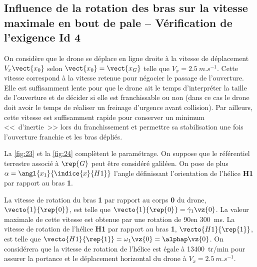 \subsection{Influence de la rotation des bras sur la vitesse maximale en bout de pale ­-- Vérification de l’exigence Id 4}

On considère que le drone se déplace en ligne droite à la vitesse de déplacement $V_x\vect{x_0}$
selon $\vect{x_0} = \vect{x_G}$ telle que $V_x = \SI{2,5}{m.s^{-1}}$. Cette vitesse correspond à la vitesse retenue pour négocier
le passage de l’ouverture. Elle est suffisamment lente pour que le drone ait le temps d’interpréter la taille de l’ouverture et de décider si elle est franchissable ou non (dans ce cas
le drone doit avoir le temps de réaliser un freinage d’urgence avant collision). Par ailleurs,
cette vitesse est suffisamment rapide pour conserver un minimum <<~d’inertie~>> lors du franchissement et permettre sa stabilisation une fois l’ouverture franchie et les bras dépliés.

La \autoref{fig:23} et la \autoref{fig:24} complètent le paramétrage. 
On suppose que le référentiel terrestre
associé à $\rep{G}$ peut être considéré galiléen. On pose de plus $\alpha = \angl{x_1}{\indice{x}{H1}}$ l’angle définissant
l’orientation de l’hélice \textbf{H1} par rapport au bras \textbf{1}.

La vitesse de rotation du bras \textbf{1} par rapport au corps \textbf{0} du drone, $\vecto{1}{\rep{0}}$, est telle que $\vecto{1}{\rep{0}} = \dot{\gamma}_1\vz{0}$. La valeur maximale de cette vitesse est obtenue par une rotation de 90\degres en \SI{300}{ms}.
La vitesse de rotation de l’hélice \textbf{H1} par rapport au bras \textbf{1}, $\vecto{H1}{\rep{1}}$, est telle que 
$\vecto{H1}{\rep{1}} = \omega_1\vz{0} = \alphap \vz{0}$. 
On considérera que la vitesse de rotation de l’hélice est égale à
\SI{13 400}{tr/min} pour assurer la portance et le déplacement horizontal du drone à $V_x = \SI{2,5}{m.s^{-1}}$.

\ifprof
\begin{corrige}
\end{corrige}
\else
\fi

\ifprof
\begin{corrige}
\end{corrige}
\else
\fi

